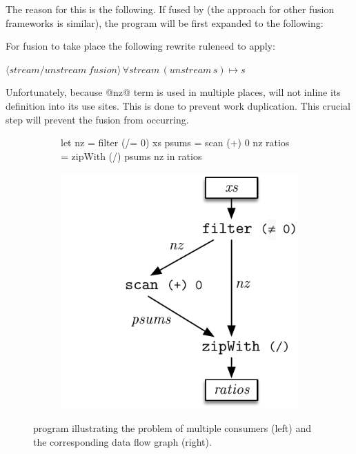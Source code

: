 \documentclass[preamble.tex]{subfiles}
\begin{document}
The reason for this is the following. If fused by \StreamFusion (the approach for other fusion frameworks is similar), the program will be first expanded to the following:


For fusion to take place the following rewrite rule\irwrules need to apply:

$\langle {}\rangle\, \forall stream\, (unstream\, s)\mapsto s$

Unfortunately, because @nz@ term is used in multiple places, \GHC will not inline its definition into its use sites. This is done to prevent work duplication. This crucial step will prevent the fusion from occurring.

\begin{figure}

\begin{subfigure}{.5\textwidth}%
\begin{hscode}
let nz     = filter (/= 0) xs
    psums  = scan (+) 0 nz
    ratios = zipWith (/) psums nz
in  ratios
\end{hscode}
\end{subfigure}%
%
\begin{subfigure}{.5\textwidth}%
\includegraphics[center,scale=0.85]{img/ratios}%
\end{subfigure}%

\caption{ program illustrating the problem of multiple consumers (left) and the corresponding data flow graph (right).}
\label{fig:ratios}
\end{figure}
\end{document}
